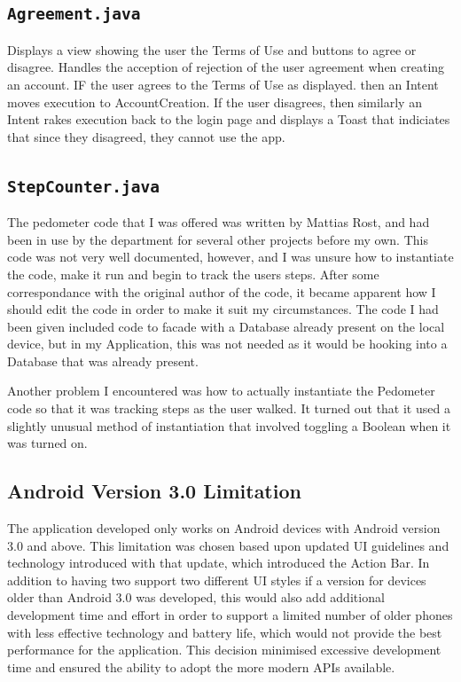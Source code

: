 \documentclass{l4proj}
\begin{document}
\subsection{\texttt{Agreement.java}}
 
Displays a view showing the user the Terms of Use and buttons to agree or disagree. Handles the acception of rejection of the user agreement when creating an account. IF the user agrees to the Terms of Use as displayed. then an Intent moves execution to AccountCreation. If the user disagrees, then similarly an Intent rakes execution back to the login page and displays a Toast that indiciates that since they disagreed, they cannot use the app.

\subsection{\texttt{StepCounter.java}}

The pedometer code that I was offered was written by Mattias Rost, and had been in use by the department for several other projects before my own. This code was not very well documented, however, and I was unsure how to instantiate the code, make it run and begin to track the users steps.  After some correspondance with the original author of the code, it became apparent how I should edit the code in order to make it suit my circumstances. The code I had been given included code to facade with a Database already present on the local device, but in my Application, this was not needed as it would be hooking into a Database that was already present.

Another problem I encountered was how to actually instantiate the Pedometer code so that it was tracking steps as the user walked. It turned out that it used a slightly unusual method of instantiation that involved toggling a Boolean when it was turned on.

\subsection{Android Version 3.0 Limitation}

The application developed only works on Android devices with Android version 3.0 and above. This limitation was chosen based upon updated UI guidelines and technology introduced with that update, which introduced the Action Bar. In addition to having two support two different UI styles if a version for devices older than Android 3.0 was developed, this would also add additional development time and effort in order to support a limited number of older phones with less effective technology and battery life, which would not provide the best performance for the application. This decision minimised excessive development time and ensured the ability to adopt the more modern APIs available.
\end{document}
